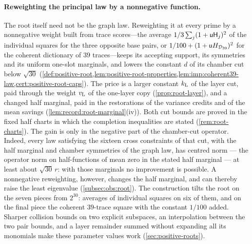 \paragraph{Reweighting the principal law by a nonnegative function.}
The root itself need not be the graph law. Reweighting it at every prime by a
nonnegative weight built from trace scores---the average
$1/3\sum_j(1+\mathsf u\mathsf H_{j})^2$ of the individual squares for the three
opposite base pairs, or $1/100+(1+\mathsf u H_{\mathcal D_{39}})^2$ for the
coherent dictionary of $39$ traces---keeps its accepting support, its symmetries and its uniform one-slot
marginals, and lowers the constant $d$ of its chamber cut below $\sqrt{30}$
(\cref{def:positive-root,lem:positive-root-properties,lem:imp:coherent39-law,cert:positive-root-caps}). The
price is a larger constant $k_{\rm L}$ of the layer cut, paid through the
weight $v_{\rm L}$ of the one-layer copy (\cref{prop:root-layer}), and a changed
half marginal, paid in the restorations of the variance credits and of the
mean savings (\cref{lem:record:root-marginal}(iv)). Both cut bounds are proved
in the fixed half charts in which the completion inequalities are stated
(\cref{rem:root-charts}). The gain is only in the negative part
of the chamber-cut operator. Indeed, every law satisfying the
sixteen cross constraints of that cut, with the half marginal and
chamber symmetries of the graph law, has centred norm --- the
operator norm on half-functions of mean zero in the stated half
marginal --- at least about $\sqrt{30}\,r$: with those marginals
no improvement is
possible. A nonnegative reweighting, however, changes the half
marginal, and can thereby raise the least eigenvalue
(\cref{subsec:obs:root}). The construction tilts the root on the
seven pieces from $2^{30}$: averages of individual squares on six
of them, and on the final piece the coherent $39$-trace square
with the constant $1/100$ added. Sharper collision bounds on two
explicit subspaces, an interpolation between the two pair bounds,
and a layer remainder summed without expanding all its monomials
make these parameter values work (\cref{sec:positive-roots}).

